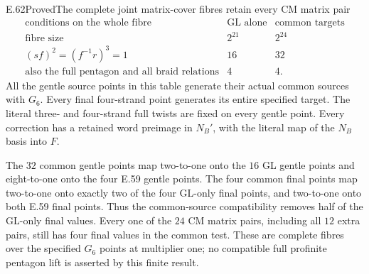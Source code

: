 \begin{statement}{E.62}{Proved}{The complete joint matrix-cover fibres retain every CM matrix pair}
\[\begin{array}{l|r|r}
 \text{conditions on the whole fibre}&\text{GL alone}&
                    \text{common targets}\\\hline
 \text{fibre size}&2^{21}&2^{24}\\
 (sf)^2=(f^{-1}r)^3=1&16&32\\
 \text{also the full pentagon and all braid relations}&4&4.
 \end{array}
 \tag{E.62.6}
\]
All the gentle source points in this table generate their actual common
sources with $G_6$.  Every final four-strand point generates its entire
specified target.  The literal three- and four-strand full twists are
fixed on every gentle point.  Every correction has a retained word
preimage in $N_B'$, with the literal map of the $N_B$ basis into $F$.

The $32$ common gentle points map two-to-one onto the $16$ GL gentle
points and eight-to-one onto the four E.59 gentle points.  The four
common final points map two-to-one onto exactly two of the four GL-only
final points, and two-to-one onto both E.59 final points.  Thus the
common-source compatibility removes half of the GL-only final values.
Every one of the $24$ CM matrix pairs, including all $12$ extra pairs,
still has four final values in the common test.  These are complete
fibres over the specified $G_6$ points at multiplier one; no compatible
full profinite pentagon lift is asserted by this finite result.
\end{statement}

